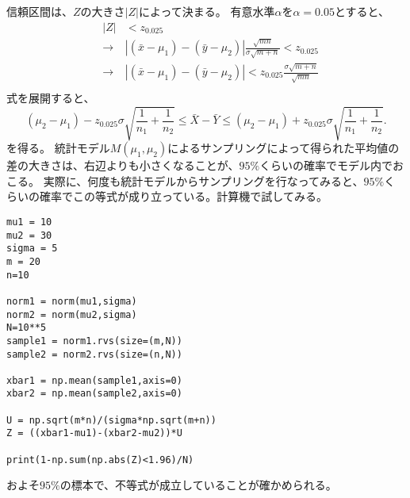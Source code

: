 信頼区間は、$Z$の大きさ$|Z|$によって決まる。
有意水準$\alpha$を$\alpha=0.05$とすると、
\begin{eqnarray*}
&|Z|& < z_{0.025}\\
&\rightarrow & |(\bar{x}-\mu_1)-(\bar{y}-\mu_2)|\frac{\sqrt{mn}}{\sigma\sqrt{m+n}} < z_{0.025}\\
&\rightarrow& |(\bar{x}-\mu_1)-(\bar{y}-\mu_2)| <z_{0.025}\frac{ \sigma\sqrt{m+n} }{ \sqrt{mn }}\\
\end{eqnarray*}
式を展開すると、
\begin{equation*}
    (\mu_2-\mu_1)-z_{0.025}\sigma\sqrt{\frac{1}{n_1}+\frac{1}{n_2}} \leq \bar{X}-\bar{Y} \leq (\mu_2-\mu_1)+z_{0.025}\sigma\sqrt{\frac{1}{n_1}+\frac{1}{n_2}}.
\end{equation*}
を得る。
統計モデル$M(\mu_1,\mu_2)$によるサンプリングによって得られた平均値の差の大きさは、右辺よりも小さくなることが、$95\%$くらいの確率でモデル内でおこる。
実際に、何度も統計モデルからサンプリングを行なってみると、$95\%$くらいの確率でこの等式が成り立っている。計算機で試してみる。
\begin{lstlisting}
mu1 = 10
mu2 = 30
sigma = 5
m = 20
n=10

norm1 = norm(mu1,sigma)
norm2 = norm(mu2,sigma)
N=10**5
sample1 = norm1.rvs(size=(m,N))
sample2 = norm2.rvs(size=(n,N))

xbar1 = np.mean(sample1,axis=0)
xbar2 = np.mean(sample2,axis=0)

U = np.sqrt(m*n)/(sigma*np.sqrt(m+n))
Z = ((xbar1-mu1)-(xbar2-mu2))*U

print(1-np.sum(np.abs(Z)<1.96)/N)
\end{lstlisting}
\begin{comment}
\begin{lstlisting}
 mu1 = 10
mu2 = 10
sigma = 5
m=10
n=20

norm1 = norm(mu1,sigma)
norm2 = norm(mu2,sigma)

sample1 = norm1.rvs(size=(m,1000))
sample2 = norm2.rvs(size=(n,1000))

xbar1 = np.average(sample1,axis=0)
xbar2 = np.average(sample2,axis=0)
A = np.abs(xbar1-xbar2) < norm(0,1).interval(1-0.05)[1]*sigma*np.sqrt(m+n)/np.sqrt(m*n)
len(np.where(A==True)[0])
\end{lstlisting}


\begin{lstlisting}
def tTest(X,Y,sigma):
    x_bar,y_bar = np.average(X),np.average(Y)
    M,N = len(X),len(Y)
    Z = (x_bar-y_bar)*np.sqrt(M*N)/(sigma*np.sqrt(M+N))
    p=norm.cdf(Z,0,1)
    return 1-p
tTest(X,Y,5.7)
\end{lstlisting}

\begin{lstlisting}
def rejectRange(X,Y,sigma):
    M,N = len(X),len(Y)
    Z = sigma*(np.sqrt(M+N))/np.sqrt(M*N)
    za,zb= norm.interval(0.95,0,1)
    return Z*za,Z*zb
rejectRange(X,Y,5.7)
\end{lstlisting}


\end{comment}
およそ$95\%$の標本で、不等式が成立していることが確かめられる。

